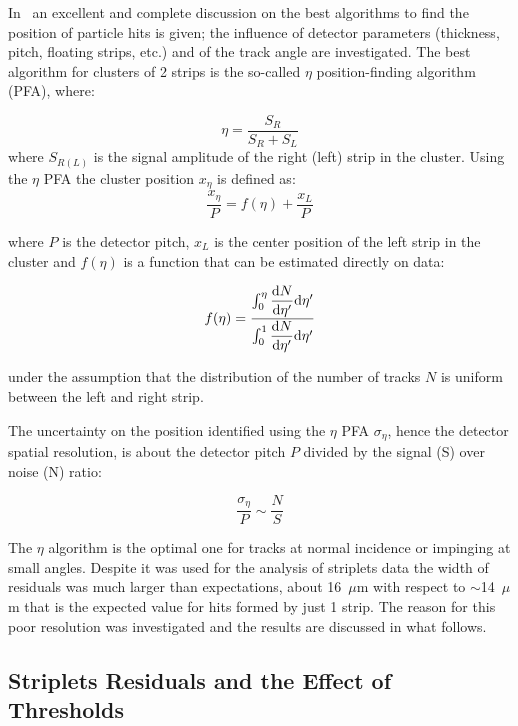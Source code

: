 In~\cite{TURCHETTA} an excellent and complete discussion on the best algorithms to find 
the position of particle hits is given; the influence of detector parameters (thickness, pitch, 
floating strips, etc.) and of the track angle are investigated.
The best algorithm for clusters of 2 strips is the so-called $\eta$ position-finding algorithm (PFA), 
where:

\begin{equation}
\eta=\dfrac{S_R}{S_R+S_L}
\label{eq:eta}
\end{equation} 
where $S_{R(L)}$ is the signal amplitude of the right (left) strip in the cluster.
Using the $\eta$  PFA the cluster position $x_{\eta}$ is defined as:
 \begin{equation}
\dfrac{x_{\eta}}{P}=f(\eta)+\dfrac{x_L}{P}
\label{eq:xeta}
\end{equation} 

where $P$ is the detector pitch, $x_L$ is the center position of the left strip in the cluster and 
$f(\eta)$ is a function that can be estimated directly on data:

\begin{equation}
f(\eta)=\dfrac{\int_0^\eta \dfrac{{\rm d}N}{{\rm d}\eta'}{\rm d}\eta'}{\int_0^1 \dfrac{{\rm d}N}{{\rm d}\eta'}{\rm d}\eta'}
\end{equation}

under the assumption that the distribution of the number of tracks $N$ is uniform between 
the left and right strip.

The uncertainty  on the position identified using the  $\eta$ PFA $\sigma_{\eta}$, hence the detector spatial 
resolution, is about the detector pitch $P$ 
divided by the signal (S) over noise (N) ratio:

\begin{equation}
\dfrac{\sigma_{\eta}}{P}\sim\dfrac{N}{S}
\label{eq:etanoise}
\end{equation}

The $\eta$ algorithm is the optimal one for tracks at normal incidence or impinging at small angles. 
Despite it was used for the analysis of striplets data the width of residuals was much 
larger than expectations, about 16~$\mu$m with respect to $\sim$14~$\mu$m that is the 
expected value  for hits formed by just 1 strip. The reason for this poor resolution 
was investigated and the results are discussed in what follows.

\subsection{Striplets Residuals and the Effect of Thresholds}

